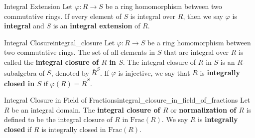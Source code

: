 \begin{definition}{Integral Extension}{}
    Let $\varphi:R\to S$ be a ring homomorphism between two commutative rings. If every element of $S$ is integral over $R$, then we say $\varphi$ is \textbf{integral} and $S$ is an \textbf{integral extension} of $R$.
\end{definition}

\begin{definition}{Integral Closure}{integral_closure}
    Let $\varphi:R\to S$ be a ring homomorphism between two commutative rings. The set of all elements in $S$ that are integral over $R$ is called the \textbf{integral closure of $R$ in $S$}. The integral closure of $R$ in $S$ is an $R$-subalgebra of $S$, denoted by $\overline{R}^S$. If $\varphi$ is injective, we say that $R$ is \textbf{integrally closed in $S$} if $\varphi(R)=\overline{R}^S$.
\end{definition}

\begin{definition}{Integral Closure in Field of Fractions}{integral_closure_in_field_of_fractions}
    Let $R$ be an integral domain. The \textbf{integral closure of $R$} or \textbf{normalization of $R$} is defined to be the integral closure of $R$ in $\mathrm{Frac}(R)$. We say $R$ is \textbf{integrally closed} if $R$ is integrally closed in $\mathrm{Frac}(R)$.
\end{definition}

